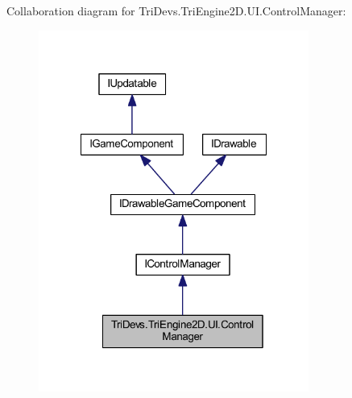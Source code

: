 Collaboration diagram for Tri\-Devs.\-Tri\-Engine2\-D.\-U\-I.\-Control\-Manager\-:\nopagebreak
\begin{figure}[H]
\begin{center}
\leavevmode
\includegraphics[width=251pt]{class_tri_devs_1_1_tri_engine2_d_1_1_u_i_1_1_control_manager__coll__graph}
\end{center}
\end{figure}
